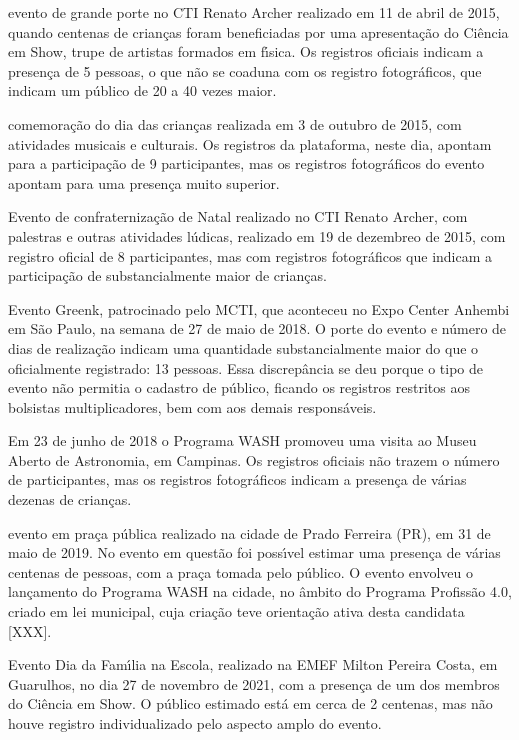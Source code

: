 \documentclass[
12pt,		%
openright,	%
twoside,  %
a4paper,			%
chapter=TITLE,		%
english,			%
french,				%
spanish,			%
brazil				%
]{USPSC-classe/USPSC}
\begin{document}
\begin{alineas}
\item evento de grande porte no CTI Renato Archer realizado em 11 de abril de 2015, quando centenas de crian\c{c}as foram beneficiadas por uma apresenta\c{c}\~ao do Ci\^encia em Show, trupe de artistas formados em f\'{\i}sica. Os registros oficiais indicam a presen\c{c}a de 5 pessoas, o que n\~ao se coaduna com os registro fotogr\'aficos, que indicam um p\'ublico de 20 a 40 vezes maior.
\item comemora\c{c}\~ao do dia das crian\c{c}as realizada em 3 de outubro de 2015, com atividades musicais e culturais. Os registros da plataforma, neste dia, apontam para a participa\c{c}\~ao de 9 participantes, mas os registros fotogr\'aficos do evento apontam para uma presen\c{c}a muito superior.
\item Evento de confraterniza\c{c}\~ao de Natal realizado no CTI Renato Archer, com palestras e outras atividades l\'udicas, realizado em 19 de dezembreo de 2015, com registro oficial de 8 participantes, mas com registros fotogr\'aficos que indicam a participa\c{c}\~ao de substancialmente maior de crian\c{c}as.
\item Evento Greenk, patrocinado pelo MCTI, que aconteceu no Expo Center Anhembi em S\~ao Paulo, na semana de 27 de maio de 2018. O porte do evento e n\'umero de dias de realiza\c{c}\~ao indicam uma quantidade substancialmente maior do que o oficialmente registrado: 13 pessoas. Essa discrep\^ancia se deu porque o tipo de evento n\~ao permitia o cadastro de p\'ublico, ficando os registros restritos aos bolsistas multiplicadores, bem com aos demais respons\'aveis.
\item Em 23 de junho de 2018 o Programa WASH promoveu uma visita ao Museu Aberto de Astronomia, em Campinas. Os registros oficiais n\~ao trazem o n\'umero de participantes, mas os registros fotogr\'aficos indicam a presen\c{c}a de v\'arias dezenas de crian\c{c}as.
\item evento em pra\c{c}a p\'ublica realizado na cidade de Prado Ferreira (PR), em 31 de maio de 2019. No evento em quest\~ao foi poss\'{\i}vel estimar uma presen\c{c}a de v\'arias centenas de pessoas, com a pra\c{c}a tomada pelo p\'ublico. O evento envolveu o lan\c{c}amento do Programa WASH na cidade, no \^ambito do Programa Profiss\~ao 4.0, criado em lei municipal, cuja cria\c{c}\~ao teve orienta\c{c}\~ao ativa desta candidata [XXX].
\item Evento Dia da Fam\'{\i}lia na Escola, realizado na EMEF Milton Pereira Costa, em Guarulhos, no dia 27 de novembro de 2021, com a presen\c{c}a de um dos membros do Ci\^encia em Show. O p\'ublico estimado est\'a em cerca de 2 centenas, mas n\~ao houve registro individualizado pelo aspecto amplo do evento.
\end{alineas}
\end{document}
